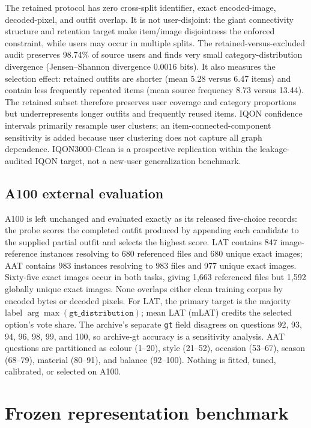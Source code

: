 \documentclass[preprint,12pt]{elsarticle}
\begin{document}
The retained protocol has zero cross-split identifier, exact encoded-image, decoded-pixel, and outfit overlap. It is not user-disjoint: the giant connectivity structure and retention target make item/image disjointness the enforced constraint, while users may occur in multiple splits. The retained-versus-excluded audit preserves 98.74\% of source users and finds very small category-distribution divergence (Jensen--Shannon divergence 0.0016 bits). It also measures the selection effect: retained outfits are shorter (mean 5.28 versus 6.47 items) and contain less frequently repeated items (mean source frequency 8.73 versus 13.44). The retained subset therefore preserves user coverage and category proportions but underrepresents longer outfits and frequently reused items. IQON confidence intervals primarily resample user clusters; an item-connected-component sensitivity is added because user clustering does not capture all graph dependence. IQON3000-Clean is a prospective replication within the leakage-audited IQON target, not a new-user generalization benchmark.

\subsection{A100 external evaluation}

A100 is left unchanged and evaluated exactly as its released five-choice records: the probe scores the completed outfit produced by appending each candidate to the supplied partial outfit and selects the highest score. LAT contains 847 image-reference instances resolving to 680 referenced files and 680 unique exact images; AAT contains 983 instances resolving to 983 files and 977 unique exact images. Sixty-five exact images occur in both tasks, giving 1,663 referenced files but 1,592 globally unique exact images. None overlaps either clean training corpus by encoded bytes or decoded pixels. For LAT, the primary target is the majority label $\arg\max(\texttt{gt\_distribution})$; mean LAT (mLAT) credits the selected option's vote share. The archive's separate \texttt{gt} field disagrees on questions 92, 93, 94, 96, 98, 99, and 100, so archive-gt accuracy is a sensitivity analysis. AAT questions are partitioned as colour (1--20), style (21--52), occasion (53--67), season (68--79), material (80--91), and balance (92--100). Nothing is fitted, tuned, calibrated, or selected on A100.

\section{Frozen representation benchmark}\label{sec:benchmark}
\end{document}
